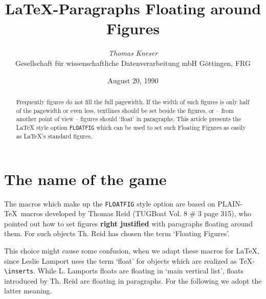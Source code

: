  \textheight
 \textwidth
 \oddsidemargin=0pt
 \evensidemargin=0pt
 
 \title{\LaTeX-Paragraphs Floating around Figures}
 \author{{\it Thomas Kneser}\\{\footnotesize
 Gesellschaft f\"ur wissenschaftliche Datenverarbeitung mbH G\"ottingen, FRG}}
 \date{August 20, 1990}
 \maketitle
 \begin{abstract}
 \noindent Frequently figures do not fill the full pagewidth. 
 If the width of such figures is only half of the pagewidth or even less,
 textlines should be set beside the figures,
 or -- from another point of view -- figures should `float'
 in paragraphs.
 This article presents the \LaTeX{} style option {\tt FLOATFIG} 
 which can be used to set such Floating Figures as easily 
 as \LaTeX's standard figures.
 \end{abstract}
 \section{The name of the game}
 The macros which make up the {\tt FLOATFIG} style option
 are based on PLAIN-\TeX\ macros developed by Thomas Reid
 (TUGBoat Vol. 8 \# 3 page 315), who pointed out
 how to set figures
 {\bf right justified} with paragraphs floating around them.
 For such objects
 Th. Reid has chosen the term `Floating Figures'.
  
 This choice might cause some confusion,
 when we adapt these macros for \LaTeX, 
 since Leslie Lamport uses the term `float' for objects
 which are realized as \TeX-\verb+\inserts+.
 While L. Lamports floats are floating in `main vertical list',
 floats introduced by Th. Reid
 are floating in paragraphs.
 For the following we adopt the latter meaning.  
